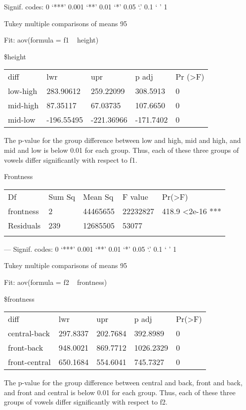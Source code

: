 \documentclass[12pt]{article}
\begin{document}
\begin{enumerate}
Signif. codes:  0 ‘***’ 0.001 ‘**’ 0.01 ‘*’ 0.05 ‘.’ 0.1 ‘ ’ 1

  Tukey multiple comparisons of means
    95%

Fit: aov(formula = f1 ~ height)

\$height
\begin{tabular}{lllll}
    diff     & lwr        & upr        & p adj     & Pr (\textgreater{}F) \\
    low-high & 283.90612  & 259.22099  & 308.5913  & 0                    \\
    mid-high & 87.35117   & 67.03735   & 107.6650  & 0                    \\
    mid-low  & -196.55495 & -221.36966 & -171.7402 & 0                   
\end{tabular}

The p-value for the group difference between low and high, mid and high, and mid and low is below 0.01 for each group. Thus, each of these three groups of vowels differ significantly with respect to f1.

Frontness

\begin{tabular}{lllll}
    Df        & Sum Sq & Mean Sq  & F value  & Pr(\textgreater{}F)        \\
    frontness & 2      & 44465655 & 22232827 & 418.9 \textless{}2e-16 *** \\
    Residuals & 239    & 12685505 & 53077    &                            \\
              &        &          &          &                           
\end{tabular}

---
Signif. codes:  0 ‘***’ 0.001 ‘**’ 0.01 ‘*’ 0.05 ‘.’ 0.1 ‘ ’ 1

  Tukey multiple comparisons of means
    95%

Fit: aov(formula = f2 ~ frontness)

\$frontness
\begin{tabular}{lllll}
    diff          & lwr      & upr      & p adj     & Pr(\textgreater{}F) \\
    central-back  & 297.8337 & 202.7684 & 392.8989  & 0                   \\
    front-back    & 948.0021 & 869.7712 & 1026.2329 & 0                   \\
    front-central & 650.1684 & 554.6041 & 745.7327  & 0                  
\end{tabular}

The p-value for the group difference between central and back, front and back, and front and central is below 0.01 for each group. Thus, each of these three groups of vowels differ significantly with respect to f2.

\end{enumerate}
\end{document}

